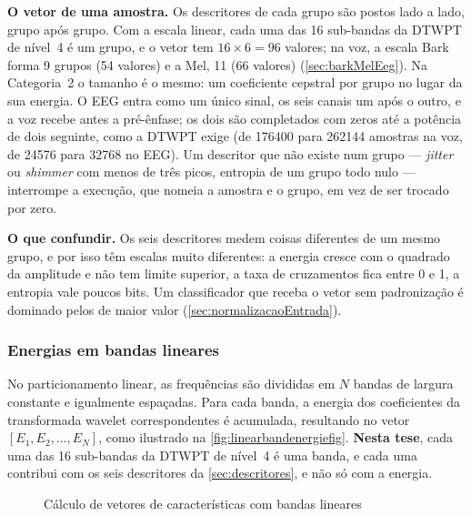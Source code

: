 				\par \textbf{O vetor de uma amostra.} Os descritores de cada grupo são postos lado a lado, grupo após grupo. Com a escala linear, cada uma das 16 sub-bandas da \ac{DTWPT} de nível~4 é um grupo, e o vetor tem $16 \times 6 = 96$ valores; na voz, a escala Bark forma 9 grupos (54 valores) e a Mel, 11 (66 valores) (\autoref{sec:barkMelEeg}). Na Categoria~2 o tamanho é o mesmo: um coeficiente cepstral por grupo no lugar da sua energia. O \ac{EEG} entra como um único sinal, os seis canais um após o outro, e a voz recebe antes a pré-ênfase; os dois são completados com zeros até a potência de dois seguinte, como a \ac{DTWPT} exige (de 176400 para 262144 amostras na voz, de 24576 para 32768 no \ac{EEG}). Um descritor que não existe num grupo --- \textit{jitter} ou \textit{shimmer} com menos de três picos, entropia de um grupo todo nulo --- interrompe a execução, que nomeia a amostra e o grupo, em vez de ser trocado por zero.

				\par \textbf{O que confundir.} Os seis descritores medem coisas diferentes de um mesmo grupo, e por isso têm escalas muito diferentes: a energia cresce com o quadrado da amplitude e não tem limite superior, a taxa de cruzamentos fica entre 0 e 1, a entropia vale poucos bits. Um classificador que receba o vetor sem padronização é dominado pelos de maior valor (\autoref{sec:normalizacaoEntrada}).

		\subsubsection{Energias em bandas lineares}
			\par No particionamento linear, as frequências são divididas em $N$ bandas de largura constante e igualmente espaçadas. Para cada banda, a energia dos coeficientes da transformada wavelet correspondentes é acumulada, resultando no vetor $[E_1, E_2, \ldots, E_N]$, como ilustrado na \autoref{fig:linearbandenergiefig}. \textbf{Nesta tese}, cada uma das 16 sub-bandas da \ac{DTWPT} de nível~4 é uma banda, e cada uma contribui com os seis descritores da \autoref{sec:descritores}, e não só com a energia.

			\begin{figure}[h]
				\centering
				\caption{Cálculo de vetores de características com bandas lineares}
				\resizebox{0.6\linewidth}{!}{}
				\label{fig:linearbandenergiefig}
			\end{figure}

